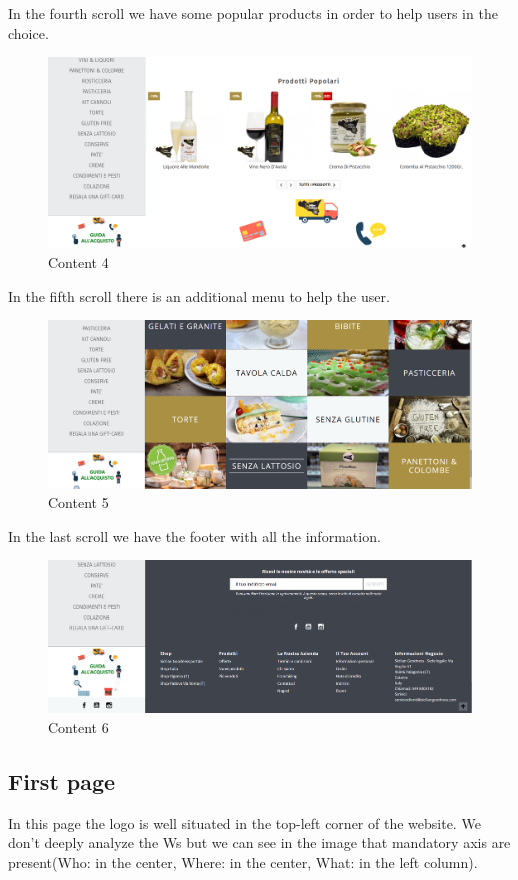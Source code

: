 In the fourth scroll we have some popular products in order to help users in the choice.

\begin{figure}[H]
	\centering\includegraphics[width=12cm]{Img/con4.png}
	\caption{Content 4}
\end{figure}

In the fifth scroll there is an additional menu to help the user.

\begin{figure}[H]
	\centering\includegraphics[width=12cm]{Img/con5.png}
	\caption{Content 5}
\end{figure}

In the last scroll we have the footer with all the information.

\begin{figure}[H]
	\centering\includegraphics[width=12cm]{Img/con6.png}
	\caption{Content 6}
\end{figure}

\pagebreak

\subsection{First page} \label{sho}
In this page the logo is well situated in the top-left corner of the website.
We don't deeply analyze the Ws but we can see in the image that  mandatory axis are present(Who: in the center, Where: in the center, What: in the left column).

